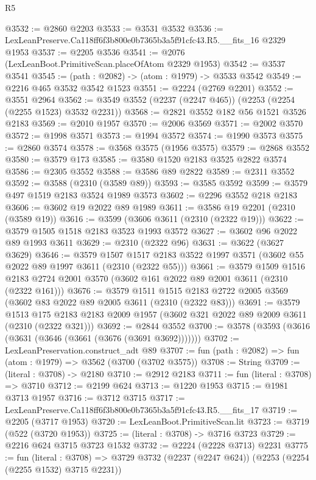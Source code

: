 \begin{lexlean}{R5}
\begin{coremodule}
@3532 := @2860 @2203
@3533 := @3531 @3532
@3536 := LexLeanPreserve.Ca118ff6f3b800e0b7365b3a5f91cfc43.R5.__fits_16 @2329 @1953
@3537 := @2205 @3536
@3541 := @2076 (LexLeanBoot.PrimitiveScan.placeOfAtom @2329 @1953)
@3542 := @3537 @3541
@3545 := (path : @2082) -> (atom : @1979) -> @3533 @3542
@3549 := @2216 @465 @3532 @3542 @1523
@3551 := @2224 (@2769 @2201)
@3552 := @3551 @2964
@3562 := @3549 @3552 (@2237 (@2247 @465)) (@2253 (@2254 (@2255 @1523) @3532 @2231))
@3568 := @2821 @3552 @182 @56 @1521 @3526 @2183
@3569 := @2010 @1957
@3570 := @2006 @3569
@3571 := @2002 @3570
@3572 := @1998 @3571
@3573 := @1994 @3572
@3574 := @1990 @3573
@3575 := @2860 @3574
@3578 := @3568 @3575 (@1956 @3575)
@3579 := @2868 @3552
@3580 := @3579 @173
@3585 := @3580 @1520 @2183 @3525 @2822 @3574
@3586 := @2305 @3552
@3588 := @3586 @89 @2822
@3589 := @2311 @3552
@3592 := @3588 (@2310 (@3589 @89))
@3593 := @3585 @3592
@3599 := @3579 @497 @1519 @2183 @3524 @1989 @3573
@3602 := @2296 @3552 @218 @2183
@3606 := @3602 @19 @2022 @89 @1989
@3611 := @3586 @19 @2201 (@2310 (@3589 @19))
@3616 := @3599 (@3606 @3611 (@2310 (@2322 @19)))
@3622 := @3579 @1505 @1518 @2183 @3523 @1993 @3572
@3627 := @3602 @96 @2022 @89 @1993 @3611
@3629 := @2310 (@2322 @96)
@3631 := @3622 (@3627 @3629)
@3646 := @3579
    @1507
    @1517
    @2183
    @3522
    @1997
    @3571
    (@3602 @55 @2022 @89 @1997 @3611 (@2310 (@2322 @55)))
@3661 := @3579
    @1509
    @1516
    @2183
    @2724
    @2001
    @3570
    (@3602 @161 @2022 @89 @2001 @3611 (@2310 (@2322 @161)))
@3676 := @3579
    @1511
    @1515
    @2183
    @2722
    @2005
    @3569
    (@3602 @83 @2022 @89 @2005 @3611 (@2310 (@2322 @83)))
@3691 := @3579
    @1513
    @175
    @2183
    @2183
    @2009
    @1957
    (@3602 @321 @2022 @89 @2009 @3611 (@2310 (@2322 @321)))
@3692 := @2844 @3552
@3700 := @3578 (@3593 (@3616 (@3631 (@3646 (@3661 (@3676 (@3691 @3692)))))))
@3702 := LexLeanPreservation.construct_adt @89
@3707 := fun (path : @2082) => fun (atom : @1979) => @3562 (@3700 (@3702 @3575))
@3708 := String
@3709 := (literal : @3708) -> @2180
@3710 := @2912 @2183
@3711 := fun (literal : @3708) => @3710
@3712 := @2199 @624
@3713 := @1220 @1953
@3715 := @1981 @3713 @1957
@3716 := @3712 @3715
@3717 := LexLeanPreserve.Ca118ff6f3b800e0b7365b3a5f91cfc43.R5.__fits_17
@3719 := @2205 (@3717 @1953)
@3720 := LexLeanBoot.PrimitiveScan.lit
@3723 := @3719 (@522 (@3720 @1953))
@3725 := (literal : @3708) -> @3716 @3723
@3729 := @2216 @624 @3715 @3723 @1532
@3732 := @2224 (@2228 @3713) @2231
@3775 := fun (literal : @3708) =>
  @3729
    @3732
    (@2237 (@2247 @624))
    (@2253 (@2254 (@2255 @1532) @3715 @2231))

\end{coremodule}
\end{lexlean}
